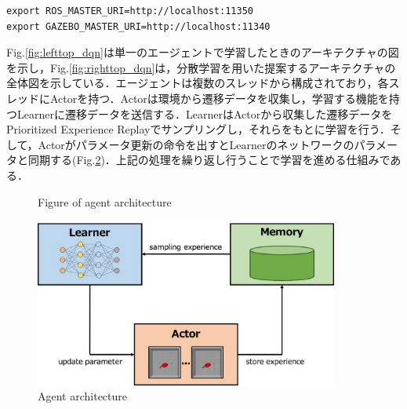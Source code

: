\documentclass[12pt]{sonota/aislab}
\begin{document}
\begin{lstlisting}
export ROS_MASTER_URI=http://localhost:11350
export GAZEBO_MASTER_URI=http://localhost:11340
\end{lstlisting}

Fig.\ref{fig:lefttop_dqn}は単一のエージェントで学習したときのアーキテクチャの図を示し，Fig.\ref{fig:righttop_dqn}は，分散学習を用いた提案するアーキテクチャの全体図を示している．エージェントは複数のスレッドから構成されており，各スレッドにActorを持つ．Actorは環境から遷移データを収集し，学習する機能を持つLearnerに遷移データを送信する．LearnerはActorから収集した遷移データをPrioritized Experience Replayでサンプリングし，それらをもとに学習を行う．そして，Actorがパラメータ更新の命令を出すとLearnerのネットワークのパラメータと同期する(Fig.\ref{agent_architecture})．上記の処理を繰り返し行うことで学習を進める仕組みである．

\begin{figure}[tbp]

	\begin{center}
	\hspace{10mm}
	\end{center}
	
	\caption{Figure of agent architecture}
	\label{fig:twofig_dqn}
\end{figure}

\begin{figure}[t]
\begin{center}
\includegraphics[clip, width=10cm]{figs/apex_agent_structure.eps}
\caption{Agent architecture}
\label{agent_architecture}
\end{center}
\end{figure}
\end{document}
